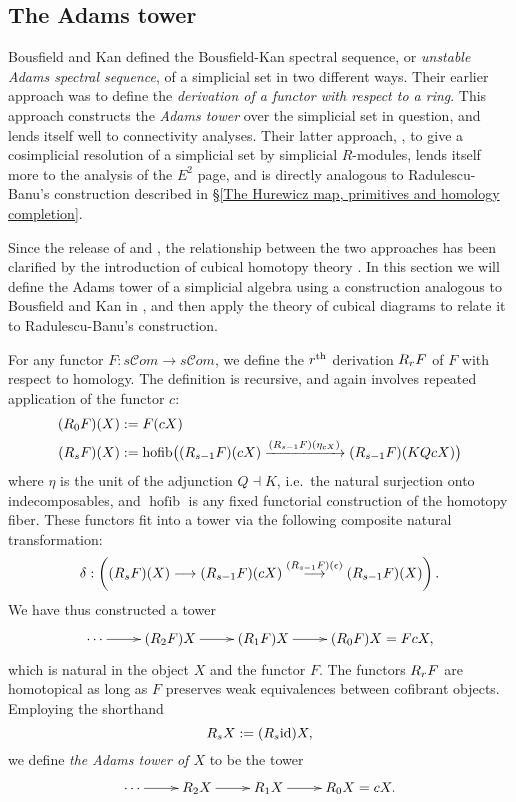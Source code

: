 \documentclass[11pt]{amsart}
\theoremstyle{plain}
\theoremstyle{definition}
\DeclareMathOperator*{\hofib}{hofib}
\renewcommand{\to}{\longrightarrow}
\newcommand{\scrC}{\mathscr{C}}
\theoremstyle{plain}
\newcommand{\Id}{\textup{id}}
\newcommand{\algcat}{{\scrC\!\textit{om}}}%
\newcommand{\dupdown}[2]{R_{\smash{#1}}}
\begin{document}
\begin{Bousfield-Kan spectral sequence}
\subsection{The Adams tower}\label{sec:derWRTab}\label{sec:relnWithRB}
Bousfield and Kan defined the Bousfield-Kan spectral sequence, or \emph{unstable Adams spectral sequence}, of a simplicial set in two different ways. Their earlier approach \cite{BK_pairings.pdf} was to define the \emph{derivation of a functor with respect to a ring}. This approach constructs the \emph{Adams tower} over the simplicial set in question, and lends itself well to connectivity analyses. Their latter approach, \cite{BousKanSSeq.pdf}, to give a cosimplicial resolution of a simplicial set by simplicial $R$-modules, lends itself more to the analysis of the $E^2$ page, and is directly analogous to Radulescu-Banu's construction described in \S\ref{The Hurewicz map, primitives and homology completion}.

Since the release of \cite{BK_pairings.pdf} and \cite{BousKanSSeq.pdf}, the relationship between the two approaches has been clarified by the introduction of cubical homotopy theory \cite{GoodwillieCalcII}. In this section we will define the Adams tower of a simplicial algebra using a construction analogous to Bousfield and Kan in \cite{BK_pairings.pdf}, and then apply the theory of cubical diagrams to relate it to Radulescu-Banu's construction. 


For any functor $F:s\algcat\to s\algcat$, we define the $r^\textup{th}$ derivation $\dupdown{r}{c}F$ of $F$ with respect to  homology. The definition is recursive, and again involves repeated application of the functor $c$: 
\begin{alignat*}{2}
(\dupdown{0}{c}F)(X)
&:=
F(cX)%
\\
(\dupdown{s}{c}F)(X)
&:=
\hofib\bigl((\dupdown{s-1}{c}F)(cX)\xrightarrow{(\dupdown{s-1}{c}F)(\eta_{cX})} (\dupdown{s-1}{c}F)(KQcX)\bigr)
\end{alignat*}
where $\eta$ is the unit of the adjunction $Q\dashv K$, i.e.\ the natural surjection onto indecomposables, and $\hofib$ is any fixed  functorial construction of the homotopy fiber. These functors fit into a tower via the following composite natural transformation:
\[\delta:\left((\dupdown{s}{c}F)(X)\to (\dupdown{s-1}{c}F)(cX)\overset{(\dupdown{s-1}{c}F)(\epsilon)}{\to} (\dupdown{s-1}{c}F)(X)\right).\]
We have thus constructed a tower
\[\xymatrix@R=4mm{
\cdots 
\ar[r]
&%
(\dupdown{2}{c}F)X
\ar[r]
&%
(\dupdown{1}{c}F)X
\ar[r]&%
(\dupdown{0}{c}F)X=FcX,
}\]
which is natural in the object $X$ and the functor $F$.
The functors $\dupdown{r}{c}F$ are homotopical as long as $F$ preserves weak equivalences between cofibrant objects. Employing the shorthand
\[\dupdown{s}{c}X:=(\dupdown{s}{c}\Id )X,\]
we define \emph{the Adams tower of $X$} to be the tower
\[\xymatrix@R=4mm{
\cdots 
\ar[r]
&%
\dupdown{2}{c}X
\ar[r]
&%
\dupdown{1}{c}X
\ar[r]&%
\dupdown{0}{c}X=cX.
}\]


\end{Bousfield-Kan spectral sequence}
\end{document}
